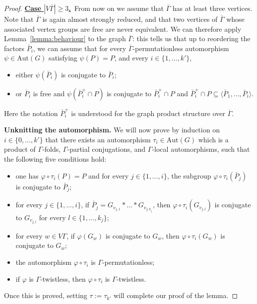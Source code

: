 \documentclass[a4paper,english,11pt]{article}
\theoremstyle{definition}
\theoremstyle{remark}
\newcommand{\Aut}{\mathrm{Aut}}
\begin{document}
\begin{proof}
\medskip

\underline{\textbf{Case $|V\overline{\Gamma}|\geq 3$.}}~From now on we assume that $\overline{\Gamma}$ has at least three vertices. Note that $\overline{\Gamma}$ is again almost strongly reduced, and that two vertices of $\overline{\Gamma}$ whose associated vertex groups are free are never equivalent. We can therefore apply Lemma~\ref{lemma:behaviour} to the graph $\overline{\Gamma}$: this tells us that up to reordering the factors $\bar P_i$, we can assume that for every $\overline{\Gamma}$-permutationless automorphism $\psi\in\Aut(G)$ satisfying $\psi(P)=P$, and every $i\in\{1,\dots,k'\}$, 
\begin{itemize}
\item either $\psi(\bar P_i)$ is conjugate to $\bar P_i$;
\item or $\bar P_i$ is free and $\psi(\bar P_i^+\cap P)$ is conjugate to $\bar P_i^+\cap P$ and $\bar P_i^+\cap P\subseteq \langle \bar P_1,\dots,\bar P_i\rangle$.
\end{itemize}
Here the notation $\bar P_i^+$ is understood for the graph product structure over $\overline{\Gamma}$.

\smallskip

\textbf{Unknitting the automorphism.} We will now prove by induction on $i\in\{0,\dots,k'\}$ that there exists an automorphism $\tau_i\in\Aut(G)$ which is a product of $\Gamma$-folds, $\Gamma$-partial conjugations, and $\Gamma$-local automorphisms, such that the following five conditions hold:
\begin{itemize}
    \item one has $\varphi\circ \tau_i(P)=P$ and for every $j\in\{1,\dots,i\}$, the subgroup $\varphi\circ\tau_i(\bar P_j)$ is conjugate to $\bar P_j$;
    \item for every $j\in\{1,\dots,i\}$, if $\bar P_j=G_{v_{j,1}}\ast\dots \ast G_{v_{j,k_j}}$, then $\varphi\circ\tau_i(G_{v_{j,l}})$ is conjugate to $G_{v_{j,l}}$ for every $l\in \{1,\dots,k_j\}$;
    \item for every $w\in V\Gamma$, if $\varphi(G_w)$ is conjugate to $G_w$, then $\varphi\circ\tau_i(G_w)$ is conjugate to $G_w$;
    \item the automorphism $\varphi\circ\tau_i$ is $\Gamma$-permutationless;
    \item if $\varphi$ is $\Gamma$-twistless, then $\varphi\circ\tau_i$ is $\Gamma$-twistless.
\end{itemize}

Once this is proved, setting $\tau:=\tau_{k'}$ will complete our proof of the lemma.


\end{proof}
\end{document}
